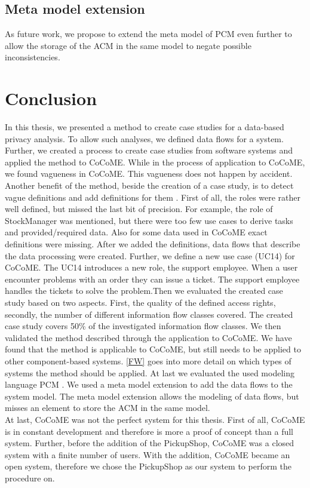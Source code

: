 \subsection{Meta model extension}
As future work, we propose to extend the meta model of PCM even further to allow the storage of the ACM in the same model to negate possible inconsistencies.
\section{Conclusion}
In this thesis, we presented a method to create case studies for a data-based privacy analysis. To allow such analyses, we defined data flows for a system. Further, we created a process to create case studies from software systems and applied the method to CoCoME. While in the process of application to CoCoME, we found vagueness in CoCoME. This vagueness does not happen by accident. Another benefit of the method, beside the creation of a case study, is to detect vague definitions and add definitions for them . First of all, the roles were rather well defined, but missed the last bit of precision. For example, the role of StockManager was mentioned, but there were too few use cases to derive tasks and provided/required data. Also for some data used in CoCoME exact definitions were missing. After we added the definitions, data flows that describe the data processing were created. Further, we define a new use case (UC14) for CoCoME. The UC14 introduces a new role, the support employee. When a user encounter problems with an order they can issue a ticket. The support employee handles the tickets to solve the problem.Then we evaluated the created case study based on two aspects. First, the quality of the defined access rights, secondly, the number of different information flow classes covered. The created case study  covers 50\% of the investigated information flow classes. We then validated the method described through the application to CoCoME. We have found that the method is applicable to CoCoME, but still needs to be applied to other component-based systems.  \autoref{FW} goes into more detail on which types of systems the method should be applied.  At last we evaluated the used modeling language PCM \cite{PCM}. We used a meta model extension to add the data flows to the system model. The meta model extension allows the modeling of data flows, but misses an element to store the ACM in the same model.\\
At last, CoCoME was not the perfect system for this thesis. First of all, CoCoME is in constant development and therefore is more a proof of concept than a full system. Further, before the addition of the PickupShop, CoCoME was a closed system with a finite number of users. With the addition, CoCoME became an open system, therefore we chose the PickupShop as our system to perform the procedure on.
